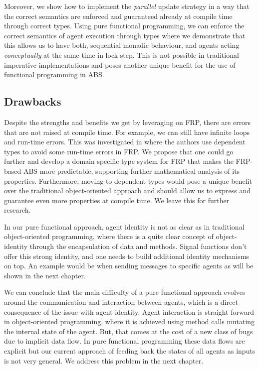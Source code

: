 Moreover, we show how to implement the \textit{parallel} update strategy \cite{thaler_art_2017} in a way that the correct semantics are enforced and guaranteed already at compile time through correct types. Using pure functional programming, we can enforce the correct semantics of agent execution through types where we demonstrate that this allows us to have both, sequential monadic behaviour, and agents acting \textit{conceptually} at the same time in lock-step. This is not possible in traditional imperative implementations and poses another unique benefit for the use of functional programming in ABS.

\subsection{Drawbacks}
Despite the strengths and benefits we get by leveraging on FRP, there are errors that are not raised at compile time. For example, we can still have infinite loops and run-time errors. This was investigated in \cite{sculthorpe_safe_2009} where the authors use dependent types to avoid some run-time errors in FRP. We propose that one could go further and develop a domain specific type system for FRP that makes the FRP-based ABS more predictable, supporting further mathematical analysis of its properties. Furthermore, moving to dependent types would pose a unique benefit over the traditional object-oriented approach and should allow us to express and guarantee even more properties at compile time. We leave this for further research.

In our pure functional approach, agent identity is not as clear as in traditional object-oriented programming, where there is a quite clear concept of object-identity through the encapsulation of data and methods. Signal functions don't offer this strong identity, and one needs to build additional identity mechanisms on top. An example would be when sending messages to specific agents as will be shown in the next chapter.

We can conclude that the main difficulty of a pure functional approach evolves around the communication and interaction between agents, which is a direct consequence of the issue with agent identity. Agent interaction is straight forward in object-oriented programming, where it is achieved using method calls mutating the internal state of the agent. But, that comes at the cost of a new class of bugs due to implicit data flow. In pure functional programming these data flows are explicit but our current approach of feeding back the states of all agents as inputs is not very general. We address this problem in the next chapter.

